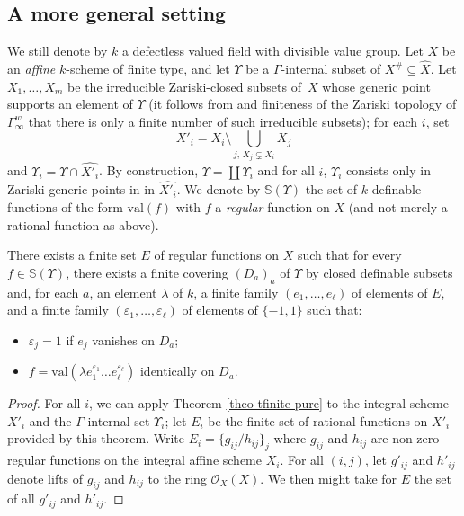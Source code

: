 \documentclass[JEP,XML,SOM,Unicode,ThmDefs,NoEqCountersInSection,published]{cedram}
\newcommand{\val}{\mathrm{val}}
\renewcommand{\SS}{\mathbb S}
\let\epsilon\varepsilon
\theoremstyle{plain}
\theoremstyle{definition}
\begin{document}
\subsection{A more general setting}
We still denote by $k$ a defectless valued field with divisible value group. Let $X$
be an \textit{affine} $k$-scheme of finite type, and let $\Upsilon$ be a $\Gamma$\nobreakdash-inter\-nal subset
of $X^{\#} \subseteq \widehat X$. Let $X_1,\ldots, X_m$ be the irreducible Zariski-closed subsets of~$X$ whose generic point supports
an element of $\Upsilon$ (it follows from \cite[Cor.\,10.4.6]{HL} and finiteness of the Zariski topology of
$\Gamma_\infty^w$ that there is only a finite number of such irreducible subsets); for each $i$, set
\[X'_i=X_i\setminus \bigcup_{j,\, X_j\subsetneq X_i}X_j\] and $\Upsilon_i=\Upsilon\cap \widehat{X'_i}$. By construction, $\Upsilon=\coprod \Upsilon_i$ and for  all $i$, $\Upsilon_i$ consists only in
Zariski-generic
points in
in $\widehat{X'_i}$.
We denote by $\SS(\Upsilon)$ the set of $k$-definable functions of the form $\val (f)$ with $f$ a \emph{regular} function on $X$ (and not merely a rational function as above).

\begin{prop}
There exists a finite set $E$ of regular functions on $X$ such that for every $f\in \SS(\Upsilon)$, there exists a finite covering $(D_a)_a$ of $\Upsilon$
by closed definable subsets and, for each $a$, an element $\lambda$ of $k$, a finite family $(e_1,\ldots, e_\ell)$
of elements of $E$, and a finite family $(\epsilon_1,\ldots, \epsilon_\ell)$ of elements of $\{-1,1\}$
such that:
\begin{itemize}
\item
$\epsilon_j=1$ if $e_j$ vanishes on $D_a$;
\item
$f=\val(\lambda e_1^{\epsilon_1}\ldots e_\ell^{\epsilon_\ell})$ identically on $D_a$.
\end{itemize}
\end{prop}

\begin{proof}
For all $i$, we can apply Theorem \ref{theo-tfinite-pure}
to the integral scheme $X'_i$ and the $\Gamma$-internal set $\Upsilon_i$; let $E_i$ be the finite set of rational functions on $X'_i$ provided
by this theorem. Write $E_i=\{g_{ij}/h_{ij}\}_j$ where $g_{ij}$ and $h_{ij}$ are non-zero regular functions
on the integral affine scheme $X_i$.
For all $(i,j)$, let $g'_{ij}$ and $h'_{ij}$ denote lifts of $g_{ij}$ and $h_{ij}$ to the ring $\mathscr O_X(X)$. We then might take for $E$ the set of all
$g'_{ij}$ and $h'_{ij}$.
\end{proof}
\end{document}
